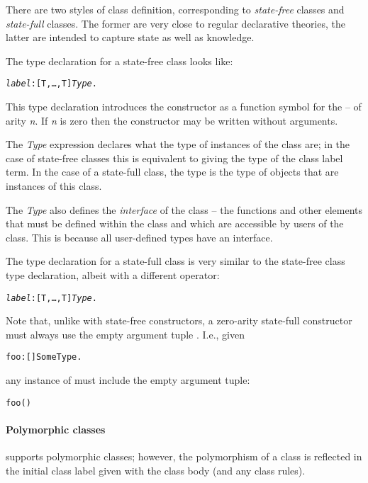 There are two styles of class definition, corresponding to \emph{state-free} classes and \emph{state-full} classes. The former are very close to regular declarative theories, the latter are intended to capture state as well as knowledge.

The type declaration for a state-free class looks like:
\begin{alltt}
\emph{label}:[T,\ldots,T\subn] \conarrow{} \emph{Type}.
\end{alltt}
This type declaration introduces the constructor  as a function symbol for the  -- of arity \emph{n}. If \emph{n} is zero then the constructor may be written without arguments.

The \emph{Type} expression declares what the type of instances of the class are; in the case of state-free classes this is equivalent to giving the type of the class label term. In the case of a state-full class, the type is the type of objects that are instances of this class.

The \emph{Type} also defines the \emph{interface} of the class -- the functions and other elements that must be defined within the class and which are accessible by users of the class. This is because all user-defined types have an interface.

The type declaration for a state-full class is very similar to the state-free class type declaration, albeit with a different operator:
\begin{alltt}
\emph{label}:[T,\ldots,T\subn] \sconarrow{} \emph{Type}.
\end{alltt}

Note that, unlike with state-free constructors, a zero-arity state-full constructor must always use the empty argument tuple \q{()}. I.e., given
\begin{alltt}
foo:[]\sconarrow{}SomeType.
\end{alltt}
any instance of  must include the empty argument tuple:
\begin{alltt}
foo()
\end{alltt}

\paragraph{Polymorphic classes}
\go supports polymorphic classes; however, the polymorphism of a class is reflected in the initial class label given with the class body (and any class rules).

